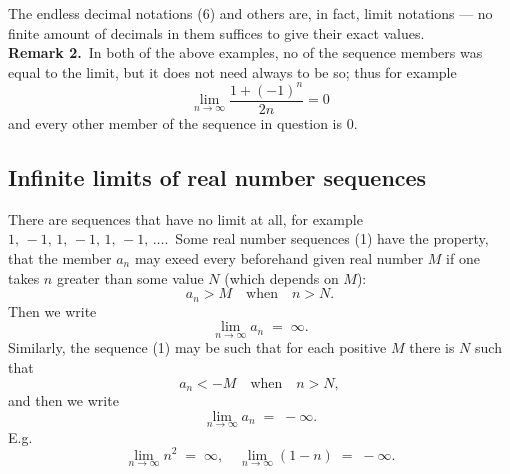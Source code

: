 \documentclass[12pt]{article}
\theoremstyle{definition}
\begin{document}
The endless decimal notations (6) and others are, in fact, limit notations --- no finite amount of decimals in them suffices to give their exact values.\\

\textbf{Remark 2.}\, In both of the above examples, no of the sequence members was equal to the limit, but it does not need always to be so; thus for example
$$\lim_{n\to\infty}\frac{1\!+\!(-1)^n}{2n} = 0$$
and every other member of the sequence in question is 0.\\

\subsection*{Infinite limits of real number sequences}

There are sequences that have no limit at all, for example\, $1,\,-1,\,1,\,-1,\,1,\,-1,\,\ldots$.\, Some real number sequences (1) have the property, that the member $a_n$ may exeed every beforehand given real number $M$ if one takes 
$n$ greater than some value $N$ (which depends on $M$):
$$a_n > M \quad \mbox{when} \quad n > N.$$
Then we write
$$\lim_{n\to\infty}a_n \;=\; \infty.$$
Similarly, the sequence (1) may be such that for each positive $M$ there is $N$ such that
$$a_n < -M \quad \mbox{when} \quad n > N,$$
and then we write
$$\lim_{n\to\infty}a_n \;=\; -\infty.$$
E.g.
$$\lim_{n\to\infty}n^2 \;=\; \infty, \quad \lim_{n\to\infty}(1\!-\!n) \;=\; -\infty.$$




\end{document}
